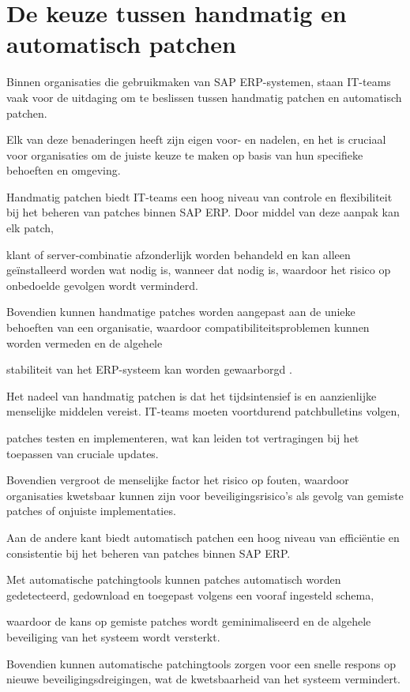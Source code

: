 \section{De keuze tussen handmatig en automatisch patchen}

Binnen organisaties die gebruikmaken van SAP ERP-systemen, staan IT-teams vaak voor de uitdaging om te beslissen tussen handmatig patchen en automatisch patchen.

Elk van deze benaderingen heeft zijn eigen voor- en nadelen, en het is cruciaal voor organisaties om de juiste keuze te maken op basis van hun specifieke behoeften en omgeving.

Handmatig patchen biedt IT-teams een hoog niveau van controle en flexibiliteit bij het beheren van patches binnen SAP ERP. Door middel van deze aanpak kan elk patch,

klant of server-combinatie afzonderlijk worden behandeld en kan alleen geïnstalleerd worden wat nodig is, wanneer dat nodig is, waardoor het risico op onbedoelde gevolgen wordt verminderd.

Bovendien kunnen handmatige patches worden aangepast aan de unieke behoeften van een organisatie, waardoor compatibiliteitsproblemen kunnen worden vermeden en de algehele 

stabiliteit van het ERP-systeem kan worden gewaarborgd \autocite{Hooper2018}. 

Het nadeel van handmatig patchen is dat het tijdsintensief is en aanzienlijke menselijke middelen vereist. IT-teams moeten voortdurend patchbulletins volgen, 

patches testen en implementeren, wat kan leiden tot vertragingen bij het toepassen van cruciale updates.

Bovendien vergroot de menselijke factor het risico op fouten, waardoor organisaties kwetsbaar kunnen zijn voor beveiligingsrisico's als gevolg van gemiste patches of onjuiste implementaties.

Aan de andere kant biedt automatisch patchen een hoog niveau van efficiëntie en consistentie bij het beheren van patches binnen SAP ERP. 

Met automatische patchingtools kunnen patches automatisch worden gedetecteerd, gedownload en toegepast volgens een vooraf ingesteld schema, 

waardoor de kans op gemiste patches wordt geminimaliseerd en de algehele beveiliging van het systeem wordt versterkt. 

Bovendien kunnen automatische patchingtools zorgen voor een snelle respons op nieuwe beveiligingsdreigingen, wat de kwetsbaarheid van het systeem vermindert. 


